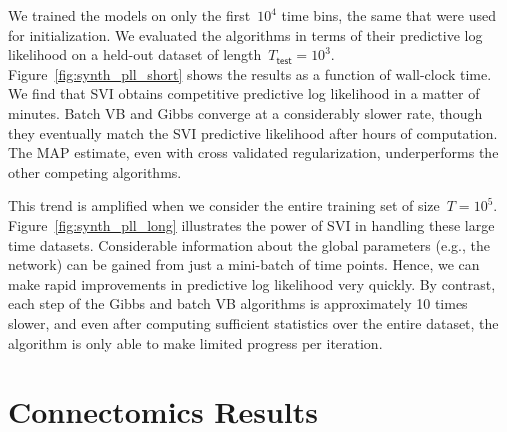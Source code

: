 We trained the models on only the first~$10^4$ time bins, the same that were used for initialization.
We evaluated the algorithms in terms of their predictive log likelihood on a held-out dataset of length~$T_{\mathsf{test}}=10^3$.
Figure~\ref{fig:synth_pll_short} shows the results as a function of wall-clock time.
We find that SVI obtains competitive predictive log likelihood in a matter of minutes.
Batch VB and Gibbs converge at a considerably slower rate, though they eventually match the SVI predictive likelihood after hours of computation.
The MAP estimate, even with cross validated regularization, underperforms the other competing algorithms.

This trend is amplified when we consider the entire training set of size~$T=10^5$.
Figure~\ref{fig:synth_pll_long} illustrates the power of SVI in handling these large time datasets.
Considerable information about the global parameters (e.g., the network) can be gained from just a mini-batch of time points.
Hence, we can make rapid improvements in predictive log likelihood very quickly.
By contrast, each step of the Gibbs and batch VB algorithms is approximately 10 times slower, and even after computing sufficient statistics over the entire dataset, the algorithm is only able to make limited progress per iteration.

\section{Connectomics Results}


